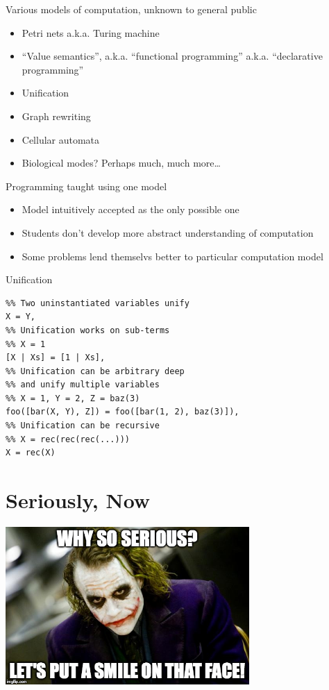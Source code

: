 \documentclass[presentation]{beamer}
\begin{document}
\begin{frame}[label=sec-2-1]{Various models of computation, unknown to general public}
\begin{itemize}
\item Petri nets a.k.a. Turing machine
\item ``Value semantics'', a.k.a. ``functional programming''
a.k.a. ``declarative programming''
\item Unification
\item Graph rewriting
\item Cellular automata
\item Biological modes? Perhaps much, much more\ldots{}
\end{itemize}
\end{frame}

\begin{frame}[label=sec-2-2]{Programming taught using one model}
\begin{itemize}
\item Model intuitively accepted as the only possible one
\item Students don't develop more abstract understanding of computation
\item Some problems lend themselvs better to particular computation
model
\end{itemize}
\end{frame}

\begin{frame}[fragile,label=sec-2-3]{Unification}
 \begin{verbatim}
%% Two uninstantiated variables unify
X = Y,
%% Unification works on sub-terms
%% X = 1
[X | Xs] = [1 | Xs],
%% Unification can be arbitrary deep
%% and unify multiple variables
%% X = 1, Y = 2, Z = baz(3)
foo([bar(X, Y), Z]) = foo([bar(1, 2), baz(3)]),
%% Unification can be recursive
%% X = rec(rec(rec(...)))
X = rec(X)
\end{verbatim}
\end{frame}

\section{Seriously, Now}
\label{sec-3}
\includegraphics[height=6cm]{./images/serious.jpg}
\end{document}
